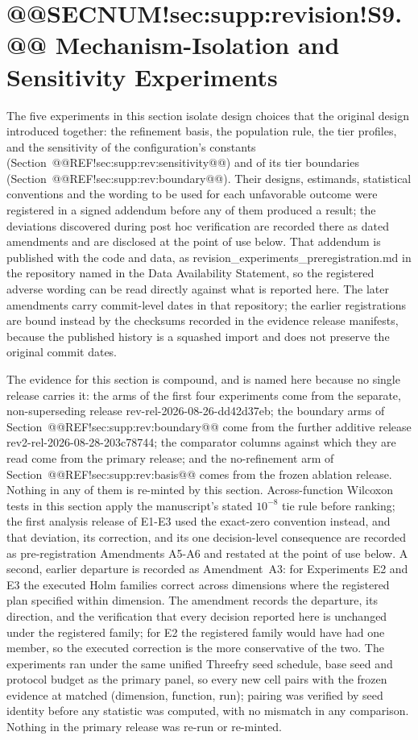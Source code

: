 \documentclass[10pt,a4paper]{article}
\begin{document}
\section{@@SECNUM!sec:supp:revision!S9.@@ Mechanism-Isolation and Sensitivity Experiments}\label{sec:supp:revision}

\noindent The five experiments in this section isolate design choices that
the original design introduced together: the refinement basis, the
population rule, the tier profiles, and the sensitivity of the
configuration's constants (Section~@@REF!sec:supp:rev:sensitivity@@) and of
its tier boundaries (Section~@@REF!sec:supp:rev:boundary@@).
Their designs, estimands, statistical conventions and the wording to
be used for each unfavorable outcome were registered in a signed addendum
before any of them produced a result; the deviations discovered during
post hoc verification are recorded there as dated amendments and are
disclosed at the point of use below.  That addendum is published with the code
and data, as revision\_experiments\_preregistration.md in the repository
named in the Data Availability Statement, so the registered adverse wording
can be read directly against what is reported here.  The later amendments
carry commit-level dates in that repository; the earlier registrations are
bound instead by the checksums recorded in the evidence release manifests,
because the published history is a squashed import and does not preserve the
original commit dates.

The evidence for this section is compound, and is named here because no
single release carries it: the arms of the first four experiments come from
the separate, non-superseding release rev-rel-2026-08-26-dd42d37eb; the boundary arms of
Section~@@REF!sec:supp:rev:boundary@@ come from the further additive release
rev2-rel-2026-08-28-203c78744; the comparator columns
against which they are read come from the primary release; and the
no-refinement arm of Section~@@REF!sec:supp:rev:basis@@ comes from the frozen
ablation release.  Nothing in any of them is re-minted by this section.
Across-function Wilcoxon tests in this section apply the manuscript's stated
$10^{-8}$ tie rule before ranking; the first analysis release of E1-E3 used
the exact-zero convention instead, and that deviation, its correction, and its
one decision-level consequence are recorded as pre-registration Amendments
A5-A6 and restated at the point of use below.  A second, earlier departure
is recorded as Amendment~A3: for Experiments E2 and E3 the executed Holm
families correct across dimensions where the registered plan specified
within dimension.  The amendment records the departure, its direction, and
the verification that every decision reported here is unchanged under the
registered family; for E2 the registered family would have had one member,
so the executed correction is the more conservative of the two.
The experiments ran under the same
unified Threefry seed schedule, base seed and protocol budget as the primary
panel, so every new cell pairs with the frozen evidence at matched
(dimension, function, run); pairing was verified by seed identity before any
statistic was computed, with no mismatch in any comparison.  Nothing in the
primary release was re-run or re-minted.
\end{document}
